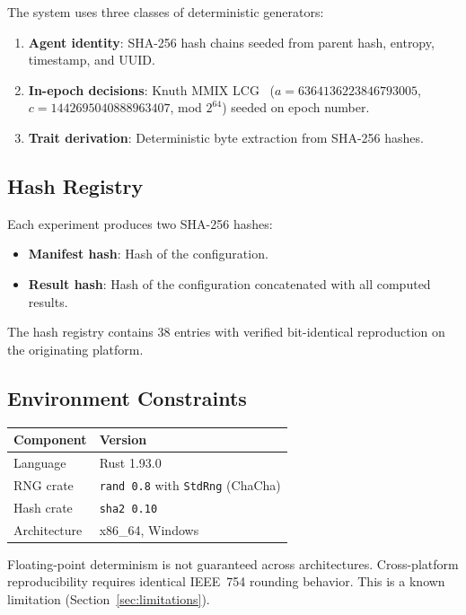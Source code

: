 \documentclass[11pt,a4paper]{article}
\begin{document}
The system uses three classes of deterministic generators:
\begin{enumerate}[nosep]
  \item \textbf{Agent identity}: SHA-256 hash chains seeded from parent hash, entropy, timestamp, and UUID.
  \item \textbf{In-epoch decisions}: Knuth MMIX LCG~\citep{knuth1997art} ($a = 6364136223846793005$, $c = 1442695040888963407$, mod $2^{64}$) seeded on epoch number.
  \item \textbf{Trait derivation}: Deterministic byte extraction from SHA-256 hashes.
\end{enumerate}

\subsection{Hash Registry}

Each experiment produces two SHA-256 hashes:
\begin{itemize}[nosep]
  \item \textbf{Manifest hash}: Hash of the configuration.
  \item \textbf{Result hash}: Hash of the configuration concatenated with all computed results.
\end{itemize}
The hash registry contains 38 entries with verified bit-identical reproduction on the originating platform.

\subsection{Environment Constraints}

\begin{table}[H]
\centering
\begin{tabular}{@{}ll@{}}
\toprule
Component & Version \\
\midrule
Language & Rust 1.93.0 \\
RNG crate & \texttt{rand 0.8} with \texttt{StdRng} (ChaCha) \\
Hash crate & \texttt{sha2 0.10} \\
Architecture & x86\_64, Windows \\
\bottomrule
\end{tabular}
\end{table}

Floating-point determinism is not guaranteed across architectures. Cross-platform reproducibility requires identical IEEE~754 rounding behavior. This is a known limitation (Section~\ref{sec:limitations}).
\end{document}
